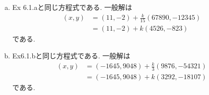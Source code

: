\begin{enumerate}[6.1]
\begin{enumerate}[(a)]
    $b = 121, a = 105$ とおくと (1)より
    \begin{align*}
      b  & = a + 16 \\
      16 & = b - a.
    \end{align*}
    (2)より
    \begin{align*}
      a &= (b - a) \times 6 + 9 \\
      9 &= 7a - 6b.
    \end{align*}
    (3)より
    \begin{align*}
      b - a &= 7a - 6b + 7 \\
      7 &= -8a + 7b.
    \end{align*}
    (4)より
    \begin{align*}
      7a - 6b &= -8a + 7b + 2 \\
      2 &= 15a - 13b.
    \end{align*}
    (5)より
    \begin{align*}
      -8a + 7b &= (15a - 13b) \times 3 + 1 \\
      -53a + 46b &= 1.
    \end{align*}
    よって, $(x, y) = (-53, 46)$は一つの方程式の解である.

    また,$g = \gcd(105, 121) = 1$であるから, 一般解は
    \[
      x = -53 + 121k, \quad
      y = 46 - 105 \quad
      (k \in \ZZ)
    \]
    である.
  \item
    Ex 6.1.aと同じ方程式である.
    一般解は
    \begin{align*}
      (x, y)
        &= (11, -2) + \frac{k}{15} (67890, -12345) \\
        &= (11, -2) + k(4526, -823)
    \end{align*}
    である.
  \item
    Ex6.1.bと同じ方程式である.
    一般解は
    \begin{align*}
      (x, y)
        &= (-1645, 9048) + \frac{k}{3}(9876, -54321) \\
        &= (-1645, 9048) + k(3292, -18107)
    \end{align*}
    である.
  \end{enumerate}
\end{enumerate} %

